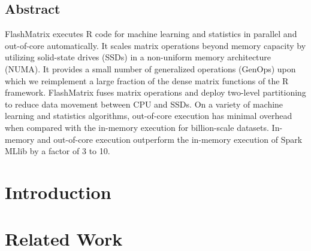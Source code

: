 \documentclass[letterpaper,twocolumn,10pt]{article}
\begin{document}
\subsection*{Abstract}
FlashMatrix executes R code for machine learning and statistics 
in parallel and out-of-core automatically.
%
%
%
It scales matrix operations
beyond memory capacity by utilizing solid-state drives (SSDs) in a non-uniform
memory architecture (NUMA). It provides a small number of generalized 
operations (GenOps) upon which we reimplement a large fraction of the dense 
matrix functions of the R framework. FlashMatrix fuses matrix operations and
deploy two-level partitioning to reduce data movement between CPU and SSDs. 
On a variety of machine learning and statistics algorithms,
out-of-core execution has minimal overhead when compared with the in-memory execution
for billion-scale datasets.
In-memory and out-of-core execution outperform the in-memory execution of
Spark MLlib by a factor of 3 to 10.

\vspace{-10pt}
\section{Introduction}
\vspace{-5pt}


\vspace{-10pt}
\section{Related Work}
\vspace{-5pt}

\end{document}
